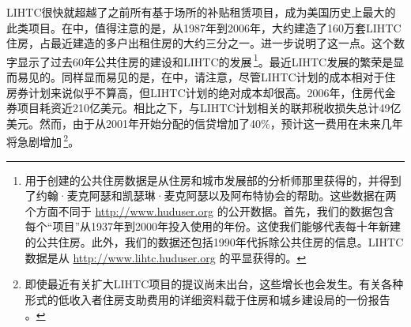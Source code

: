 \documentclass[lang=cn,11pt,a4paper]{paper}
\begin{document}
LIHTC很快就超越了之前所有基于场所的补贴租赁项目，成为美国历史上最大的此类项目。在中，值得注意的是，从1987年到2006年，大约建造了160万套LIHTC住房，占最近建造的多户出租住房的大约三分之一。进一步说明了这一点。这个数字显示了过去60年公共住房的建设和LIHTC的发展\,\footnote{用于创建的公共住房数据是从住房和城市发展部的分析师那里获得的，并得到了约翰·麦克阿瑟和凯瑟琳·麦克阿瑟以及阿布特协会的帮助。这些数据在两个方面不同于 \url{http://www.huduser.org} 的公开数据。首先，我们的数据包含每个“项目”从1937年到2000年投入使用的年份。这使我们能够代表每十年新建的公共住房。此外，我们的数据还包括1990年代拆除公共住房的信息。LIHTC数据是从 \url{http://www.lihtc.huduser.org} 的平显获得的。}。最近LIHTC发展的繁荣是显而易见的。同样显而易见的是，在中，请注意，尽管LIHTC计划的成本相对于住房券计划来说似乎不算高，但LIHTC计划的绝对成本却很高。2006年，住房代金券项目耗资近210亿美元。相比之下，与LIHTC计划相关的联邦税收损失总计49亿美元。然而，由于从2001年开始分配的信贷增加了40\%，预计这一费用在未来几年将急剧增加\,\footnote{即使最近有关扩大LIHTC项目的提议尚未出台，这些增长也会发生。有关各种形式的低收入者住房支助费用的详细资料载于住房和城乡建设局的一份报告 \cite{USCongress2005}。}。
\end{document}
